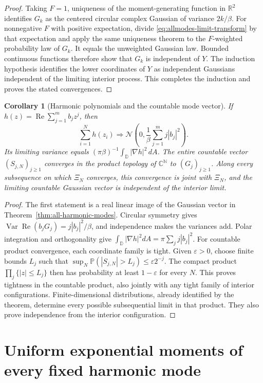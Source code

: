 \documentclass[11pt,a4paper]{article}
\numberwithin{equation}{section}
\newtheorem{corollary}[theorem]{Corollary}
\theoremstyle{definition}
\theoremstyle{remark}
\newcommand{\D}{\mathbb D}
\newcommand{\Pbb}{\mathbb P}
\newcommand{\N}{\mathbb N}
\newcommand{\C}{\mathbb C}
\DeclareMathOperator{\Var}{Var}
\begin{document}
\begin{proof}
Taking $F=1$, uniqueness of the moment-generating function in $\mathbb R^2$
identifies $G_k$ as the centered circular complex Gaussian of variance
$2k/\beta$. For nonnegative $F$ with positive expectation, divide
\eqref{eq:allmodes-limit-transform} by that expectation and apply the same
uniqueness theorem to the $F$-weighted probability law of $G_k$.
It equals the unweighted Gaussian law. Bounded continuous functions
therefore show that $G_k$ is independent of $Y$.
The induction hypothesis identifies the lower coordinates of $Y$ as
independent Gaussians independent of the limiting interior process.
This completes the induction and proves the stated convergences.
\end{proof}

\begin{corollary}[Harmonic polynomials and the countable mode vector]
If $h(z)=\operatorname{Re}\sum_{j=1}^m b_j z^j$, then
\[
 \sum_{i=1}^N h(z_i)
 \Longrightarrow\mathcal N\left(0,\frac1\beta\sum_{j=1}^m j|b_j|^2\right).
\]
Its limiting variance equals
$(\pi\beta)^{-1}\int_{\D}|\nabla h|^2\,dA$.
The entire countable vector $(S_{j,N})_{j\ge1}$ converges in the product
topology of $\C^{\N}$ to $(G_j)_{j\ge1}$. Along every subsequence on
which $\Xi_N$ converges, this convergence is joint with $\Xi_N$, and the
limiting countable Gaussian vector is independent of the interior limit.
\end{corollary}
\begin{proof}
The first statement is a real linear image of the Gaussian vector in
Theorem~\ref{thm:all-harmonic-modes}. Circular symmetry gives
$\Var\operatorname{Re}(b_jG_j)=j|b_j|^2/\beta$, and independence makes
the variances add. Polar integration and orthogonality give
$\int_{\D}|\nabla h|^2dA=\pi\sum_j j|b_j|^2$.
For countable product convergence, each coordinate family is tight.
Given $\varepsilon>0$, choose finite bounds $L_j$ such that
$\sup_N\Pbb(|S_{j,N}|>L_j)\le\varepsilon2^{-j}$.
The compact product $\prod_j\{|z|\le L_j\}$ then has probability at
least $1-\varepsilon$ for every $N$. This proves tightness in the
countable product, also jointly with any tight family of interior
configurations. Finite-dimensional distributions, already identified
by the theorem, determine every possible subsequential limit in that
product. They also prove independence from the interior configuration.
\end{proof}


\section{Uniform exponential moments of every fixed harmonic mode}
\label{sec:harmonic-exponential-moments}
\end{document}
